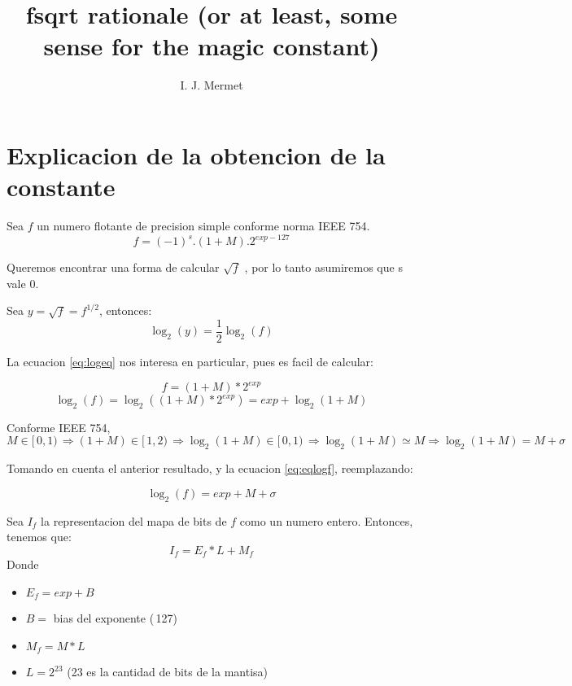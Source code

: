 \documentclass[]{article}
\title{fsqrt rationale (or at least, some sense for the magic constant)}
\author{I. J. Mermet}
\begin{document}
	
	\maketitle
	
	\section{Explicacion de la obtencion de la constante}
Sea \(f\) un numero flotante de precision simple conforme norma IEEE 754.
\begin{equation}
f = (-1)^{s}.(1+M).2^{exp-127}
\end{equation}

Queremos encontrar una forma de calcular \(\sqrt{f}\) , por lo tanto asumiremos que s vale 0.

Sea \(y=\sqrt{f}=f^{1/2}\), entonces:
\begin{equation} \label{eq:logeq}
\log_2(y)=\frac{1}{2}\log_2(f)
\end{equation}

La ecuacion \eqref{eq:logeq} nos interesa en particular, pues es facil de calcular:

\begin{equation}
f = (1 + M)*2^{exp}
\end{equation}
\begin{equation} \label{eq:eqlogf}
	\log_2(f) = \log_2((1 + M)*2^{exp}) = exp + \log_2(1+M)
\end{equation}

Conforme IEEE 754, \(M \in [\,0,1)\,\Rightarrow (1+M)\in[\,1,2)\,\Rightarrow\log_2(1+M)\in[\,0,1)\,\Rightarrow\log_2(1+M)\simeq M\Rightarrow\log_2(1+M)=M+\sigma \)

Tomando en cuenta el anterior resultado, y la ecuacion \eqref{eq:eqlogf}, reemplazando:

\begin{equation}
\log_2(f)=exp+M+\sigma
\end{equation}


Sea \(I_f\) la representacion del mapa de bits de \(f\) como un numero entero. Entonces, tenemos que:
\begin{equation}
I_f = E_f * L + M_f
\end{equation}
Donde \begin{itemize}
	\item \(E_f = exp + B\)
	\item \(B =\) bias del exponente (\,127)\,
	\item \(M_f = M * L\)
	\item \(L = 2^{23}\) (23 es la cantidad de bits de la mantisa)
\end{itemize}
\end{document}
